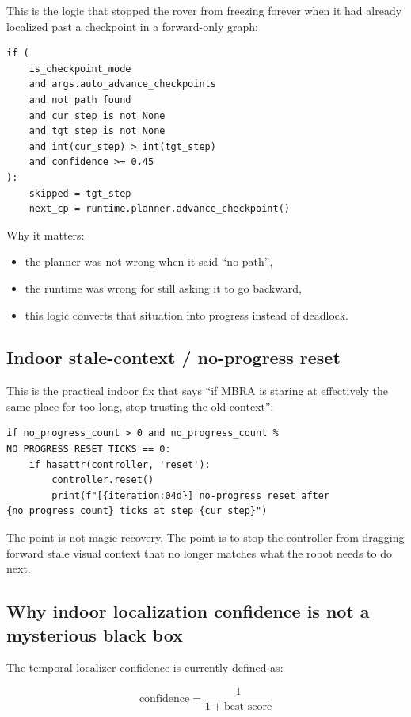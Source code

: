 \documentclass[11pt]{article}
\begin{document}
This is the logic that stopped the rover from freezing forever when it had already
localized past a checkpoint in a forward-only graph:

\begin{lstlisting}
if (
    is_checkpoint_mode
    and args.auto_advance_checkpoints
    and not path_found
    and cur_step is not None
    and tgt_step is not None
    and int(cur_step) > int(tgt_step)
    and confidence >= 0.45
):
    skipped = tgt_step
    next_cp = runtime.planner.advance_checkpoint()
\end{lstlisting}

Why it matters:

\begin{itemize}[nosep]
  \item the planner was not wrong when it said ``no path'',
  \item the runtime was wrong for still asking it to go backward,
  \item this logic converts that situation into progress instead of deadlock.
\end{itemize}

\subsection{Indoor stale-context / no-progress reset}

This is the practical indoor fix that says ``if MBRA is staring at effectively the
same place for too long, stop trusting the old context'':

\begin{lstlisting}
if no_progress_count > 0 and no_progress_count % NO_PROGRESS_RESET_TICKS == 0:
    if hasattr(controller, 'reset'):
        controller.reset()
        print(f"[{iteration:04d}] no-progress reset after {no_progress_count} ticks at step {cur_step}")
\end{lstlisting}

The point is not magic recovery. The point is to stop the controller from dragging
forward stale visual context that no longer matches what the robot needs to do next.

\subsection{Why indoor localization confidence is not a mysterious black box}

The temporal localizer confidence is currently defined as:

\[
\text{confidence} = \frac{1}{1 + \text{best score}}
\]
\end{document}

